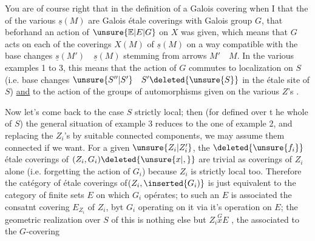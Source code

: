 You are of course right that in the definition of a Galois covering when I  that the  of the various $\underline{s}(M)$ are Galois étale coverings with Galois group $G$, that beforhand an action of $\unsure{\mathbb{E}|E|G}$ on $X$ was given, which means that $G$ acts on each of the coverings $X(M)$ of $\underline{s}(M)$ on a way compatible with the base changes $\underline{s}(M')\quad\underline{s}(M)$ stemming from arrows  $M'\quad M$. In the various examples 1 to 3, this means that the action of $G$ commutes to  localization on $S$ (i.e. base changes $\unsure{S''|S'}\quad S'\deleted{\unsure{S}}$ in the étale site of $S$) \uline{and} to the action of the groups of automorphisms given on the various $Z$'s .

Now let's come back to the case $S$ strictly local; then (for  defined over t he whole of $S$) the general situation of example 3 reduces to the one of example 2, and replacing the $Z_i$'s by suitable connected components, we may assume them connected if we want. For a given $\unsure{Z_i|Z_i'}$, the $\deleted{\unsure{f_i}}$ étale coverings of $(Z_i,G_i)\deleted{\unsure{x|,}}$ are trivial as coverings of $Z_i$ alone (i.e. forgetting the action of $G_i$) because $Z_i$ is strictly local too. Therefore the catégory of étale coverings of$(Z_i,\inserted{G_i)}$ is just equivalent to the category of finite sets $E$ on which $G_i$ opérates; to such an $E$ is associated the consatnt covering $E_{Z_i}$ of $Z_i$, byt $G_i$ operating on it via it's operation on $E$; the geometric realization over $S$ of this is nothing else but $Z_i\overset{G}{x}E$ , the  associated to the $G$-covering
